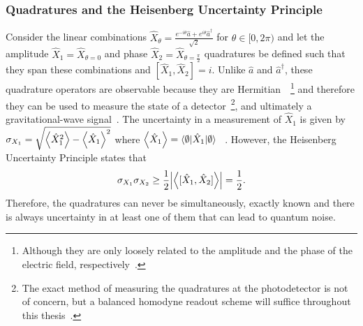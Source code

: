 \subsubsection{Quadratures and the Heisenberg Uncertainty Principle}
Consider the linear combinations $\hat{X}_\theta=\frac{e^{-i \theta}\hat{a}+e^{i \theta}\hat{a}^\dag}{\sqrt 2}$ for $\theta\in[0,2\pi)$ and let the amplitude $\hat{X}_1=\hat{X}_{\theta=0}$ and phase $\hat{X}_2=\hat{X}_{\theta=\frac{\pi}{2}}$ quadratures be defined such that they span these combinations and $[\hat{X}_1,\hat{X}_2]=i$.
Unlike $\hat a$ and $\hat a^\dag$, these quadrature operators are observable because they are Hermitian~\cite{}~\footnote{Although they are only loosely related to the amplitude and the phase of the electric field, respectively~\cite{danilishinQuantumMeasurementTheory2012}.} and therefore they can be used to measure the state of a detector~\footnote{The exact method of measuring the quadratures at the photodetector is not of concern, but a balanced homodyne readout scheme will suffice throughout this thesis~\cite{}.}, and ultimately a gravitational-wave signal~\cite{}. The uncertainty in a measurement of $\hat{X}_1$ is given by $\sigma_{X_1}=\sqrt{\ev{\hat{X}_1^2}-\ev{\hat{X}_1}^2}$ where $\ev{\hat{X}_1}=\langle\emptyset\lvert\hat{X}_1\rvert\emptyset\rangle$~\cite{} . However, the Heisenberg Uncertainty Principle states that~\cite{}
\begin{equation}\label{eq:HUP_time_domain}
\sigma_{X_1}\sigma_{X_2}\geq\frac{1}{2}\abs{\ev{[\hat{X}_1,\hat{X}_2]}}=\frac{1}{2}.
\end{equation}
Therefore, the quadratures can never be simultaneously, exactly known and there is always uncertainty in at least one of them that can lead to quantum noise. %
